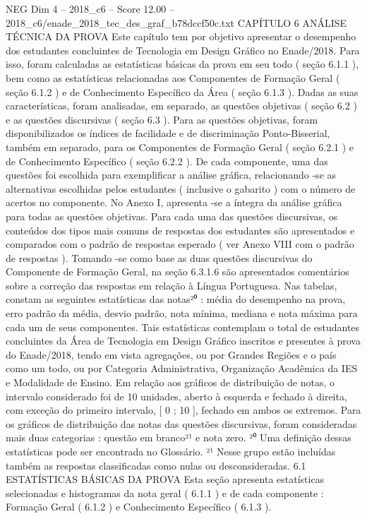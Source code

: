 \begin{textsample}{NEG Dim 4 – 2018\_c6 – Score 12.00 – 2018\_c6/enade\_2018\_tec\_des\_graf\_b78dccf50c.txt}  \label{ex:f4_neg_343}
CAPÍTULO 6 ANÁLISE TÉCNICA DA PROVA Este capítulo tem por objetivo apresentar o desempenho dos estudantes concluintes de Tecnologia em Design Gráfico no Enade/2018.
Para isso, foram calculadas as estatísticas básicas da prova em seu todo ( seção 6.1.1 ), bem como as estatísticas relacionadas aos Componentes de Formação Geral ( seção 6.1.2 ) e de Conhecimento Específico da Área ( seção 6.1.3 ).
Dadas as suas características, foram analisadas, em separado, as questões objetivas ( seção 6.2 ) e as questões discursivas ( seção 6.3 ).
Para as questões objetivas, foram disponibilizados os índices de facilidade e de discriminação Ponto-Bisserial, também em separado, para os Componentes de Formação Geral ( seção 6.2.1 ) e de Conhecimento Específico ( seção 6.2.2 ).
De cada componente, uma das questões foi escolhida para exemplificar a análise gráfica, relacionando -se as alternativas escolhidas pelos estudantes ( inclusive o gabarito ) com o número de acertos no componente.
No Anexo I, apresenta -se a íntegra da análise gráfica para todas as questões objetivas.
Para cada uma das questões discursivas, os conteúdos dos tipos mais comuns de respostas dos estudantes são apresentados e comparados com o padrão de respostas esperado ( ver Anexo VIII com o padrão de respostas ).
Tomando -se como base as duas questões discursivas do Componente de Formação Geral, na seção 6.3.1.6 são apresentados comentários sobre a correção das respostas em relação à Língua Portuguesa.
Nas tabelas, constam as seguintes estatísticas das notas²⁰ : média do desempenho na prova, erro padrão da média, desvio padrão, nota mínima, mediana e nota máxima para cada um de seus componentes.
Tais estatísticas contemplam o total de estudantes concluintes da Área de Tecnologia em Design Gráfico inscritos e presentes à prova do Enade/2018, tendo em vista agregações, ou por Grandes Regiões e o país como um todo, ou por Categoria Administrativa, Organização Acadêmica da IES e Modalidade de Ensino.
Em relação aos gráficos de distribuição de notas, o intervalo considerado foi de 10 unidades, aberto à esquerda e fechado à direita, com exceção do primeiro intervalo, [ 0 ; 10 ], fechado em ambos os extremos.
Para os gráficos de distribuição das notas das questões discursivas, foram consideradas mais duas categorias : questão em branco²¹ e nota zero. ²⁰ Uma definição dessas estatísticas pode ser encontrada no Glossário. ²¹ Nesse grupo estão incluídas também as respostas classificadas como nulas ou desconsideradas. 6.1 ESTATÍSTICAS BÁSICAS DA PROVA Esta seção apresenta estatísticas selecionadas e histogramas da nota geral ( 6.1.1 ) e de cada componente : Formação Geral ( 6.1.2 ) e Conhecimento Específico ( 6.1.3 ).

\end{textsample}
